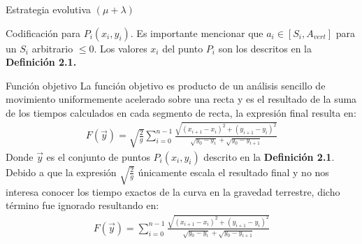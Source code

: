 \documentclass[10pt, letterpaper]{article}
\theoremstyle{definition}
\begin{document}
\begin{section}{Estrategia evolutiva $(\mu + \lambda)$}
\begin{subsection}{Codificación}
        para $P_i(x_i, y_i)$. Es importante mencionar que $a_i \in [S_i, A_{vert}]$
        para un $S_i$ arbitrario $\leq 0$. Los valores $x_i$ del punto $P_i$ son los descritos
        en la \textbf{Definición 2.1.}
    \end{subsection}
    \begin{subsection}{Función objetivo}
        La función objetivo es producto de un análisis sencillo de movimiento
        uniformemente acelerado sobre una recta y es el resultado de la suma
        de los tiempos calculados en cada segmento de recta, la expresión final
        resulta en:
        \begin{equation} \begin{gathered}
            F(\vec{y}) = \sqrt{\frac{2}{g}} \sum_{i=0}^{n-1}
                \frac
                    {\sqrt{(x_{i+1} - x_{i})^2 + (y_{i+1} - y_i)^2}}
                    {\sqrt{y_0 - y_i} + \sqrt{y_0 - y_{i+1}}}
        \end{gathered} \end{equation}
        Donde $\vec{y}$ es el conjunto de puntos $P_i(x_i, y_i)$ descrito en la
        \textbf{Definición 2.1}.\\

        Debido a que la expresión $\sqrt{\frac{2}{g}}$ únicamente escala el
        resultado final y no nos interesa conocer los tiempo exactos de la curva
        en la gravedad terrestre, dicho término fue ignorado resultando en:
        \begin{equation} \begin{gathered}
            F(\vec{y}) = \sum_{i=0}^{n-1}
                \frac
                    {\sqrt{(x_{i+1} - x_{i})^2 + (y_{i+1} - y_i)^2}}
                    {\sqrt{y_0 - y_i} + \sqrt{y_0 - y_{i+1}}}
        \end{gathered} \end{equation}
    \end{subsection}
\end{section}
\end{document}
